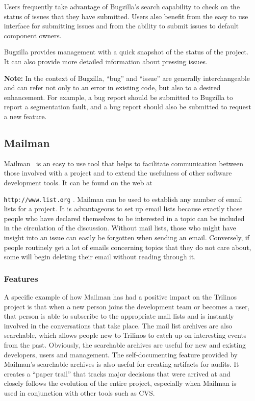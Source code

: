 \documentclass[12pt,relax]{article}
\newcommand{\InlineDirectory}[1]{
  {\hspace{0.01 in}} {\tt #1} {\hspace{0.01 in}}}
\begin{document}
Users frequently take advantage of Bugzilla's search capability to check on 
the status of issues that they have submitted.  Users also benefit from the 
easy to use interface for submitting issues and from the ability to submit 
issues to default component owners.  

Bugzilla provides management with a quick snapshot of the status of the 
project.  It can also provide more detailed information about pressing issues.

{\bf Note:} In the context of Bugzilla, ``bug'' and ``issue'' are generally 
interchangeable and can refer not only to an error in 
existing code, but also to a desired enhancement.  For example, a bug report 
should be submitted to Bugzilla to report a segmentation fault, and a bug 
report should also be submitted to request a new feature.

\subsection{Mailman}
\label{subsect:MailMan}
Mailman~\cite{Mailman} is an easy to use tool that helps to facilitate 
communication between
those involved with a project and to extend the usefulness of other 
software development tools.  It can be found on the web at 
\InlineDirectory{http://www.list.org}.  Mailman can be used to establish any 
number of 
email lists for a project.  It is advantageous to set up email lists because exactly 
those people who have declared themselves to be interested in a 
topic can be included in the circulation of the discussion.  Without 
mail lists, those who might have insight into an issue can easily be forgotten 
when sending an email.  Conversely, if people routinely get a lot of emails 
concerning topics that they do not care about, some will begin deleting
their email without reading through it.  

\subsubsection{Features}

A specific example of how Mailman 
has had a positive impact on the Trilinos project is that when a new person
joins the development team or becomes a user, that person is able to 
subscribe to the appropriate mail lists and is instantly involved in the 
conversations that take place.  The mail list archives are also searchable, 
which allows people new to Trilinos to catch up on interesting events from the 
past.  Obviously, the searchable archives are useful for new and existing 
developers, users and management.  The self-documenting feature provided 
by Mailman's searchable archives is also useful for creating artifacts for 
audits.  It creates a ``paper trail'' that tracks major decisions that were 
arrived at and closely follows 
the evolution of the entire project, especially when Mailman is used in 
conjunction with other tools such as CVS.
\end{document}
